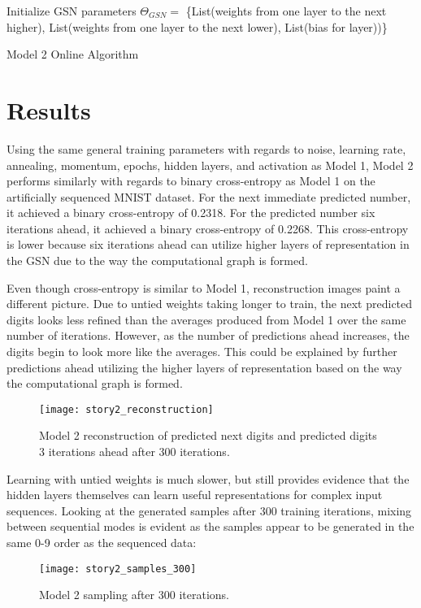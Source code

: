 \begin{algorithm}[h!]
	Initialize GSN parameters \(\Theta_{GSN} = \) \{List(weights from one layer to the next higher), List(weights from one layer to the next lower), List(bias for layer))\}\;
	\caption{ Model 2 Online Algorithm }
\end{algorithm}

\section{Results}

Using the same general training parameters with regards to noise, learning rate, annealing, momentum, epochs, hidden layers, and activation as Model 1, Model 2 performs similarly with regards to binary cross-entropy as Model 1 on the artificially sequenced MNIST dataset. For the next immediate predicted number, it achieved a binary cross-entropy of 0.2318.  For the predicted number six iterations ahead, it achieved a binary cross-entropy of 0.2268. This cross-entropy is lower because six iterations ahead can utilize higher layers of representation in the GSN due to the way the computational graph is formed.

Even though cross-entropy is similar to Model 1, reconstruction images paint a different picture. Due to untied weights taking longer to train, the next predicted digits looks less refined than the averages produced from Model 1 over the same number of iterations. However, as the number of predictions ahead increases, the digits begin to look more like the averages. This could be explained by further predictions ahead utilizing the higher layers of representation based on the way the computational graph is formed.

\begin{figure}[h!]
  \centering
    \texttt{[image: story2\_reconstruction]}
\caption{Model 2 reconstruction of predicted next digits and predicted digits 3 iterations ahead after 300 iterations.}
\end{figure}

Learning with untied weights is much slower, but still provides evidence that the hidden layers themselves can learn useful representations for complex input sequences. Looking at the generated samples after 300 training iterations, mixing between sequential modes is evident as the samples appear to be generated in the same 0-9 order as the sequenced data:
\begin{figure}[h!]
  \centering
    \texttt{[image: story2\_samples\_300]}
\caption{Model 2 sampling after 300 iterations.}
\end{figure}


